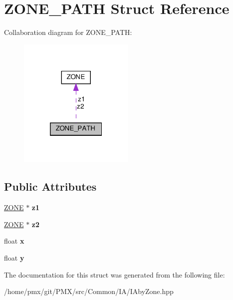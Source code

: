 \hypertarget{structZONE__PATH}{}\section{Z\+O\+N\+E\+\_\+\+P\+A\+TH Struct Reference}
\label{structZONE__PATH}


Collaboration diagram for Z\+O\+N\+E\+\_\+\+P\+A\+TH\+:
\nopagebreak
\begin{figure}[H]
\begin{center}
\leavevmode
\includegraphics[width=157pt]{structZONE__PATH__coll__graph}
\end{center}
\end{figure}
\subsection*{Public Attributes}
\begin{DoxyCompactItemize}
\item 
\mbox{\label{structZONE__PATH_a1ed6b2b2d8589aba13b22ff628e80f37}} 
\hyperlink{structZONE}{Z\+O\+NE} $\ast$ {\bfseries z1}
\item 
\mbox{\label{structZONE__PATH_a38fcbb8a4b2351f85c07ab260047db41}} 
\hyperlink{structZONE}{Z\+O\+NE} $\ast$ {\bfseries z2}
\item 
\mbox{\label{structZONE__PATH_a8b641d0c81211fa686820a7736a2f471}} 
float {\bfseries x}
\item 
\mbox{\label{structZONE__PATH_a1a10c33837c3061e14c4b9228729a02d}} 
float {\bfseries y}
\end{DoxyCompactItemize}


The documentation for this struct was generated from the following file\+:\begin{DoxyCompactItemize}
\item 
/home/pmx/git/\+P\+M\+X/src/\+Common/\+I\+A/I\+Aby\+Zone.\+hpp\end{DoxyCompactItemize}
